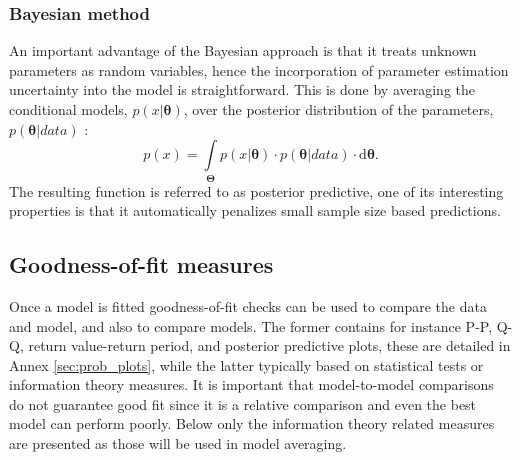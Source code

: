 \subsubsection*{Bayesian method}
An important advantage of the Bayesian approach is that it treats unknown parameters as random variables, hence the incorporation of parameter estimation uncertainty into the model is straightforward. This is done by averaging the conditional models, $p\left( {x|{\boldsymbol{\theta }}} \right)$, over the posterior distribution of the parameters, $p\left( {{\boldsymbol{\theta }}|data} \right)$ \citep{Gelman2003}:
\begin{equation}
\label{eq:postpred}
	p\left( x \right) = \int\limits_{\boldsymbol{\Theta}}  {p\left( {x|{\boldsymbol{\theta }}} \right) \cdot p\left( {{\boldsymbol{\theta }}|data} \right) \cdot \mathrm{d}} {\boldsymbol{\theta }}.
\end{equation}
The resulting function is referred to as posterior predictive, one of its interesting properties is that it automatically penalizes small sample size based predictions.


\subsection{Goodness-of-fit measures}
Once a model is fitted goodness-of-fit checks can be used to compare the data and model, and also to compare models. The former contains for instance P-P, Q-Q, return value-return period, and posterior predictive plots, these are detailed in Annex \ref{sec:prob_plots}, while the latter typically based on statistical tests or information theory measures. It is important that model-to-model comparisons do not guarantee good fit since it is a relative comparison and even the best model can perform poorly. Below only the information theory related measures are presented as those will be used in model averaging.


